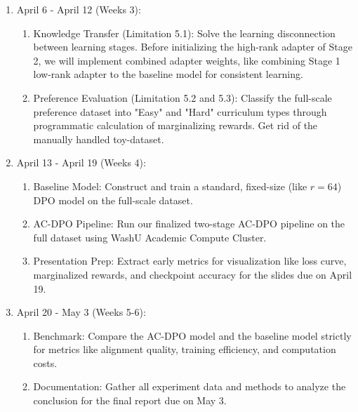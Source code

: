 \documentclass{article}
\begin{document}
\begin{enumerate}
    \item April 6 - April 12 (Weeks 3):
    \begin{enumerate}
        \item Knowledge Transfer (Limitation 5.1): Solve the learning disconnection between learning stages. Before initializing the high-rank adapter of Stage 2, we will implement combined adapter weights, like combining Stage 1 low-rank adapter to the baseline model for consistent learning.
        \item Preference Evaluation (Limitation 5.2 and 5.3): Classify the full-scale preference dataset into "Easy" and "Hard" curriculum types through programmatic calculation of marginalizing rewards. Get rid of the manually handled toy-dataset.
    \end{enumerate}
    
    \item April 13 - April 19 (Weeks 4):
    \begin{enumerate}
        \item Baseline Model: Construct and train a standard, fixed-size (like $r=64$) DPO model on the full-scale dataset.
        \item AC-DPO Pipeline: Run our finalized two-stage AC-DPO pipeline on the full dataset using WashU Academic Compute Cluster.
        \item Presentation Prep: Extract early metrics for visualization like loss curve, marginalized rewards, and checkpoint accuracy for the slides due on April 19.
    \end{enumerate}
    
    \item April 20 - May 3 (Weeks 5-6):
    \begin{enumerate}
        \item Benchmark: Compare the AC-DPO model and the baseline model strictly for metrics like alignment quality, training efficiency, and computation costs.
        \item Documentation: Gather all experiment data and methods to analyze the conclusion for the final report due on May 3. 
    \end{enumerate}
\end{enumerate}
\end{document}
